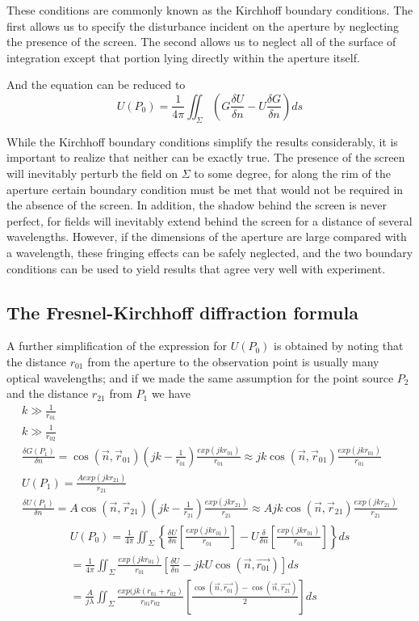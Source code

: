 \documentclass[../main.tex]{subfiles}
\begin{document}
	These conditions are commonly known as the Kirchhoff boundary conditions. The first allows us to specify the disturbance incident on the aperture by neglecting the presence of the screen. The second allows us to neglect all of the surface of integration except that portion lying directly within the aperture itself.

	And the equation can be reduced to
	\begin{equation}
	U(P_0)=\frac{1}{4\pi}\iint_{\Sigma}\left(G\frac{\delta U}{\delta n}-U\frac{\delta G}{\delta n}\right)ds
	\end{equation}

	While the Kirchhoff boundary conditions simplify the results considerably, it is important to realize that neither can be exactly true. The presence of the screen will inevitably perturb the field on $\Sigma$ to some degree, for along the rim of the aperture certain boundary condition must be met that would not be required in the absence of the screen. In addition, the shadow behind the screen is never perfect, for fields will inevitably extend behind the screen for a distance of several wavelengths. However, if the dimensions of the aperture are large compared with a wavelength, these fringing effects can be safely neglected, and the two boundary conditions can be used to yield results that agree very well with experiment.

	\subsection{The Fresnel-Kirchhoff diffraction formula}
	A further simplification of the expression for $U(P_0)$ is obtained by noting that the distance $r_{01}$ from the aperture to the observation point is usually many optical wavelengths; and if we made the same assumption for the point source $P_2$ and the distance $r_{21}$ from $P_1$ we have
	\begin{align}
	k\gg\frac{1}{r_{01}}\\
	k\gg\frac{1}{r_{02}}\\
	\frac{\delta G(P_1)}{\delta n}=\cos(\vec{n},\vec{r}_{01})(jk-\frac{1}{r_{01}})\frac{exp(jkr_{01})}{r_{01}}\approx jk \cos(\vec{n},\vec{r}_{01})\frac{exp(jkr_{01})}{r_{01}}\\
	U(P_1)=\frac{A exp(jkr_{21})}{r_{21}}\\
	\frac{\delta U(P_1)}{\delta n}=A\cos(\vec{n},\vec{r}_{21})(jk-\frac{1}{r_{21}})\frac{exp(jkr_{21})}{r_{21}}\approx Ajk \cos(\vec{n},\vec{r}_{21})\frac{exp(jkr_{21})}{r_{21}}
	\end{align}
	\begin{multline}
	U(P_0)=\frac{1}{4\pi}\iint_\Sigma\left\{\frac{\delta U}{\delta n}\left[\frac{exp(jkr_{01})}{r_{01}}\right]-U\frac{\delta}{\delta n}\left[\frac{exp(jkr_{01})}{r_{01}}\right]\right\}ds\\
	=\frac{1}{4\pi}\iint_\Sigma\frac{exp(jkr_{01})}{r_{01}}\left[\frac{\delta U}{\delta n}-jkU\cos(\vec{n},\vec{r_{01}})\right]ds\\
	=\frac{A}{j\lambda}\iint_\Sigma{\frac{exp(jk(r_{01}+r_{02})}{r_{01}r_{02}}}\left[\frac{\cos(\vec{n},\vec{r_{01}})-\cos(\vec{n},\vec{r_{21}})}{2}\right]ds
	\end{multline}
\end{document}
